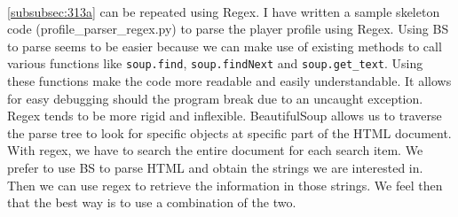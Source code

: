 \paragraph{}\ref{subsubsec:313a} can be repeated using Regex. I have written a sample skeleton code (profile_parser_regex.py)  to parse the player profile using Regex. Using BS to parse seems to be easier because we can make use of existing methods to call various functions like \verb|soup.find|, \verb|soup.findNext| and \verb|soup.get_text|. Using these functions make the code more readable and easily understandable. It allows for easy debugging should the program break due to an uncaught exception. Regex tends to be more rigid and inflexible. BeautifulSoup allows us to traverse the parse tree to look for specific objects at specific part of the HTML document. With regex, we have to search the entire document for each search item. 
We prefer to use BS to parse HTML and obtain the strings we are interested in. Then we can use regex to retrieve the information in those strings. We feel then that the best way is to use a combination of the two.
